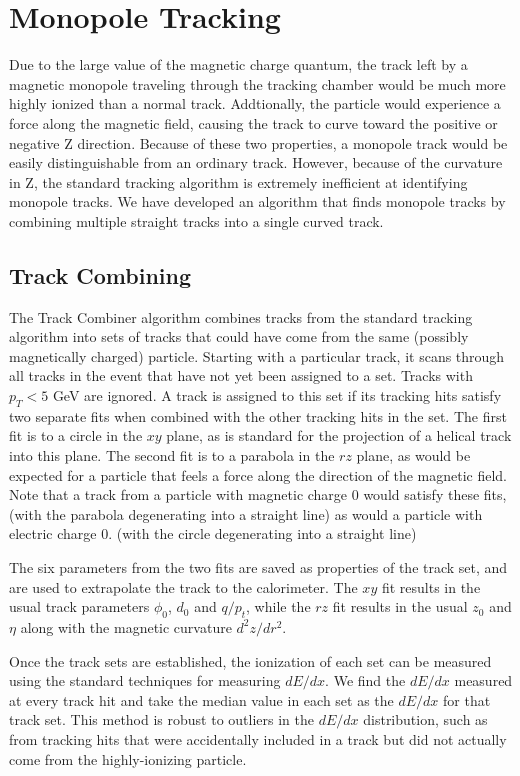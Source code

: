 \section{Monopole Tracking}

Due to the large value of the magnetic charge quantum, the track left by a magnetic monopole traveling through the tracking chamber would be much more highly ionized than a normal track.  Addtionally, the particle would experience a force along the magnetic field, causing the track to curve toward the positive or negative Z direction.  Because of these two properties, a monopole track would be easily distinguishable from an ordinary track.  However, because of the curvature in Z, the standard tracking algorithm is extremely inefficient at identifying monopole tracks.  We have developed an algorithm that finds monopole tracks by combining multiple straight tracks into a single curved track.

\subsection{Track Combining}

The Track Combiner algorithm combines tracks from the standard tracking algorithm into sets of tracks that could have come from the same (possibly magnetically charged) particle.  Starting with a particular track, it scans through all tracks in the event that have not yet been assigned to a set.  Tracks with {\color{red} $p_T<5$ GeV} are ignored.  A track is assigned to this set if its tracking hits satisfy two separate fits when combined with the other tracking hits in the set.  The first fit is to a circle in the $xy$ plane, as is standard for the projection of a helical track into this plane.  The second fit is to a parabola in the $rz$ plane, as would be expected for a particle that feels a force along the direction of the magnetic field.  Note that a track from a particle with magnetic charge 0 would satisfy these fits, (with the parabola degenerating into a straight line) as would a particle with electric charge 0. (with the circle degenerating into a straight line)

The six parameters from the two fits are saved as properties of the track set, and are used to extrapolate the track to the calorimeter.  The $xy$ fit results in the usual track parameters $\phi_0$, $d_0$ and $q/p_t$, while the $rz$ fit results in the usual $z_0$ and $\eta$ along with the magnetic curvature $d^2 z/dr^2$.

Once the track sets are established, the ionization of each set can be measured using the standard techniques for measuring $dE/dx$.  We find the $dE/dx$ measured at every track hit and take the median value in each set as the $dE/dx$ for that track set.  This method is robust to outliers in the $dE/dx$ distribution, such as from tracking hits that were accidentally included in a track but did not actually come from the highly-ionizing particle.

